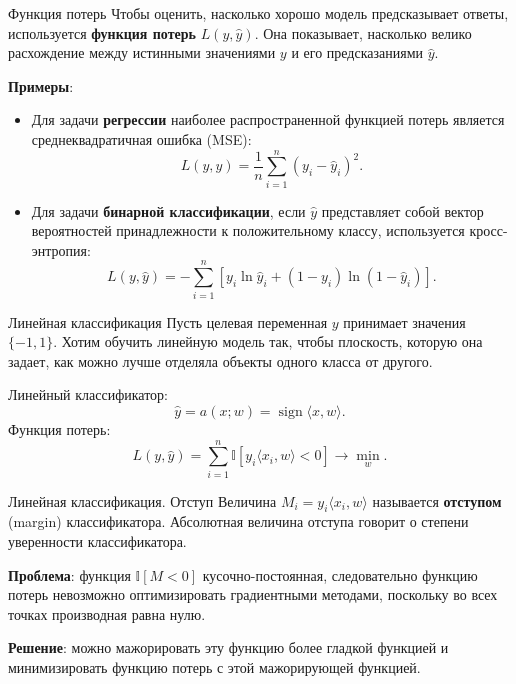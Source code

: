 \documentclass[notheorems, handout]{beamer}
\begin{document}
\begin{frame}{Функция потерь}
	Чтобы оценить, насколько хорошо модель предсказывает ответы, используется {\bf функция потерь} $L(y, \hat{y})$. Она показывает, насколько велико расхождение между истинными значениями $y$ и его предсказаниями $\hat{y}$.

		{\bf Примеры}:
	\begin{itemize}
		\item Для задачи \textbf{регрессии} наиболее распространенной функцией потерь является среднеквадратичная ошибка (MSE):
		      \[
			      L(y, \hat{y}) = \frac{1}{n}\sum_{i=1}^n (y_i - \hat y_i)^2.
		      \]
		\item Для задачи \textbf{бинарной классификации}, если $\hat y$ представляет собой вектор вероятностей принадлежности к положительному классу, используется кросс-энтропия:
		      \[
			      L(y, \hat{y}) = -\sum_{i=1}^n\left[y_i \ln\hat y_i + (1 - y_i)\ln (1 - \hat y_i)\right].
		      \]
	\end{itemize}
\end{frame}


\begin{frame}{Линейная классификация}
	Пусть целевая переменная $y$ принимает значения $\{-1, 1\}$. Хотим обучить линейную модель так, чтобы плоскость, которую она задает, как можно лучше отделяла объекты одного класса от другого.\medskip

	Линейный классификатор:
	\[
		\hat y=a(x; w)=\operatorname{sign}\langle x, w\rangle.
	\]
	Функция потерь:
	\[
		L(y, \hat{y}) = \sum_{i=1}^{n}\mathbb{I}[y_i \langle x_i, w\rangle < 0] \longrightarrow \min_{w}.
	\]
\end{frame}

\begin{frame}{Линейная классификация. Отступ}
	Величина $M_i=y_i \langle x_i, w\rangle$ называется \textbf{отступом} (margin) классификатора. Абсолютная величина отступа говорит о степени уверенности классификатора.\medskip

	\textbf{Проблема}: функция $\mathbb{I}[M < 0]$ кусочно-постоянная, следовательно функцию потерь невозможно оптимизировать градиентными методами, поскольку во всех точках производная равна нулю.\medskip

	\textbf{Решение}: можно мажорировать эту функцию более гладкой функцией и минимизировать функцию потерь с этой мажорирующей функцией.
\end{frame}
\end{document}

